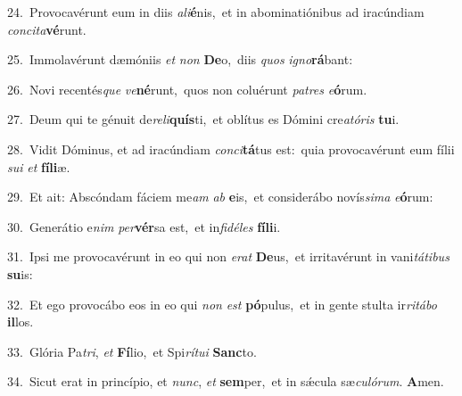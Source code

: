 {\numbfont\textcolor{\numbcolor}{24.}}~Provocavérunt eum in diis \textit{a}\-\textit{li}\textbf{é}nis,~\star et in abominatiónibus ad iracúndiam \textit{con}\-\textit{ci}\textit{ta}\textbf{vé}runt.\par
{\numbfont\textcolor{\numbcolor}{25.}}~Immolavérunt dæmóniis \textit{et} \textit{non} \textbf{De}\-o,~\star diis \textit{quos} \textit{i}\-\textit{gno}\textbf{rá}bant:\par
{\numbfont\textcolor{\numbcolor}{26.}}~Novi recentés\textit{que} \textit{ve}\-\textbf{né}runt,~\star quos non coluérunt \textit{pa}\-\textit{tres} \textit{e}\-\textbf{ó}rum.\par
{\numbfont\textcolor{\numbcolor}{27.}}~Deum qui te génuit de\-\textit{re}\-\textit{li}\textbf{quís}ti,~\star et oblítus es Dómini cre\-\textit{a}\-\textit{tó}\textit{ris} \textbf{tu}\-i.\par
{\numbfont\textcolor{\numbcolor}{28.}}~Vidit Dóminus, et ad iracúndiam \textit{con}\-\textit{ci}\textbf{tá}tus est:~\star quia provocavérunt eum fílii \textit{su}\-\textit{i} \textit{et} \textbf{fí}\-\textbf{li}æ.\par
{\numbfont\textcolor{\numbcolor}{29.}}~Et ait: Abscóndam fáciem me\textit{am} \textit{ab} \textbf{e}\-is,~\star et considerábo novís\-\textit{si}\-\textit{ma} \textit{e}\-\textbf{ó}rum:\par
{\numbfont\textcolor{\numbcolor}{30.}}~Generátio e\textit{nim} \textit{per}\-\textbf{vér}sa est,~\star et in\-\textit{fi}\-\textit{dé}\textit{les} \textbf{fí}\-\textbf{li}i.\par
{\numbfont\textcolor{\numbcolor}{31.}}~Ipsi me provocavérunt in eo qui non \textit{e}\-\textit{rat} \textbf{De}\-us,~\star et irritavérunt in vani\-\textit{tá}\-\textit{ti}\textit{bus} \textbf{su}\-is:\par
{\numbfont\textcolor{\numbcolor}{32.}}~Et ego provocábo eos in eo qui \textit{non} \textit{est} \textbf{pó}\-pulus,~\star et in gente stulta ir\-\textit{ri}\-\textit{tá}\textit{bo} \textbf{il}\-los.\par
{\numbfont\textcolor{\numbcolor}{33.}}~Glória Pa\-\textit{tri}\-, \textit{et} \textbf{Fí}\-lio,~\star et Spi\-\textit{rí}\-\textit{tu}\textit{i} \textbf{Sanc}\-to.\par
{\numbfont\textcolor{\numbcolor}{34.}}~Sicut erat in princípio, et \textit{nunc}\-, \textit{et} \textbf{sem}\-per,~\star et in sǽcula sæ\-\textit{cu}\-\textit{ló}\textit{rum}. \textbf{A}\-men.\par
